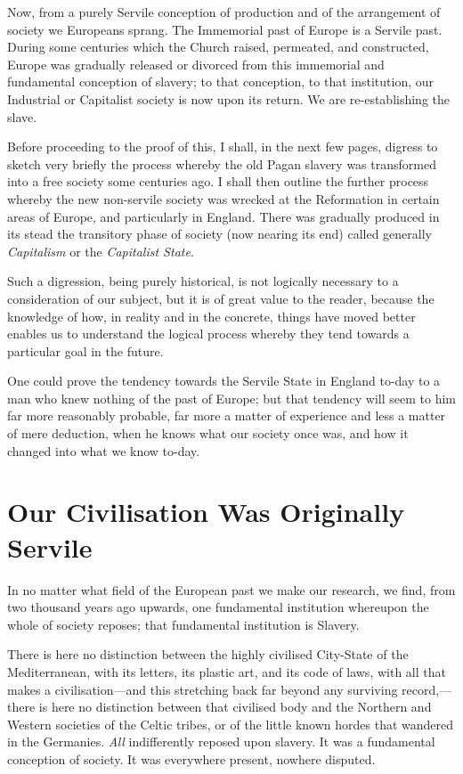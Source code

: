 \documentclass{book}
\begin{document}
Now, from a purely Servile conception of production and of the arrangement of society we Europeans sprang. The Immemorial past of Europe is a Servile past. During some centuries which the Church raised, permeated, and constructed, Europe was gradually released or divorced from this immemorial and fundamental conception of slavery; to that conception, to that institution, our Industrial or Capitalist society is now upon its return. We are re-establishing the slave.

Before proceeding to the proof of this, I shall, in the next few pages, digress to sketch very briefly the process whereby the old Pagan slavery was transformed into a free society some centuries ago. I shall then outline the further process whereby the new non-servile society was wrecked at the Reformation in certain areas of Europe, and particularly in England. There was gradually produced in its stead the transitory phase of society (now nearing its end) called generally \emph{Capitalism} or the \emph{Capitalist State}.

Such a digression, being purely historical, is not logically necessary to a consideration of our subject, but it is of great value to the reader, because the knowledge of how, in reality and in the concrete, things have moved better enables us to understand the logical process whereby they tend towards a particular goal in the future.

One could prove the tendency towards the Servile State in England to-day to a man who knew nothing of the past of Europe; but that tendency will seem to him far more reasonably probable, far more a matter of experience and less a matter of mere deduction, when he knows what our society once was, and how it changed into what we know to-day.

\chapter{Our Civilisation Was Originally Servile}
\label{chapter-2}
In no matter what field of the European past we make our research, we find, from two thousand years ago upwards, one fundamental institution whereupon the whole of society reposes; that fundamental institution is Slavery.

There is here no distinction between the highly civilised City-State of the Mediterranean, with its letters, its plastic art, and its code of laws, with all that makes a civilisation—and this stretching back far beyond any surviving record,—there is here no distinction between that civilised body and the Northern and Western societies of the Celtic tribes, or of the little known hordes that wandered in the Germanies. \emph{All} indifferently reposed upon slavery. It was a fundamental conception of society. It was everywhere present, nowhere disputed.
\end{document}
